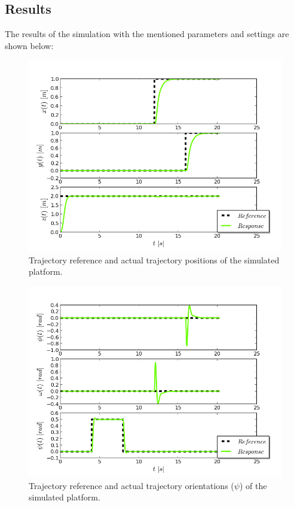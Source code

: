\subsection{Results}

The results of the simulation with the mentioned parameters and settings are shown below:\\

\begin{figure}[H]
\centering
\includegraphics[scale=0.7]{Images/Chapter5/ardrone/position_control.png}
\caption{Trajectory reference and actual trajectory positions of the simulated platform.}
\label{fig:ardrone_pos}
\end{figure}

\begin{figure}[H]
\centering
\includegraphics[scale=0.7]{Images/Chapter5/ardrone/euler_angle_control.png}
\caption{Trajectory reference and actual trajectory orientations ($\psi$) of the simulated platform.}
\label{fig:ardrone_ang}
\end{figure}

